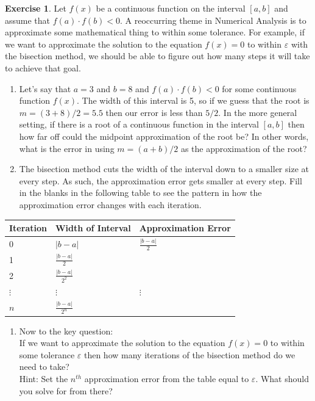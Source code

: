 \documentclass[
]{book}
\providecommand{\tightlist}{%
  \setlength{\itemsep}{0pt}\setlength{\parskip}{0pt}}
\theoremstyle{definition}
\theoremstyle{definition}
\theoremstyle{definition}
\newtheorem{exercise}{Exercise}[chapter]
\theoremstyle{remark}
\begin{document}
\begin{exercise}
\protect\hypertarget{exr:bisectionerror}{}{\label{exr:bisectionerror} }Let \(f(x)\) be a continuous function on the interval \([a,b]\) and assume
that \(f(a) \cdot f(b) <0\). A reoccurring theme in Numerical Analysis is to
approximate some mathematical thing to within some tolerance. For
example, if we want to approximate the solution to the equation \(f(x)=0\)
to within \(\varepsilon\) with the bisection method, we should be able to
figure out how many steps it will take to achieve that goal.

\begin{enumerate}
\def\labelenumi{\alph{enumi}.}
\item
  Let's say that \(a = 3\) and \(b = 8\) and \(f(a) \cdot f(b) < 0\) for
  some continuous function \(f(x)\). The width of this interval is 5, so
  if we guess that the root is \(m=(3+8)/2 = 5.5\) then our error is
  less than \(5/2\). In the more general setting, if there is a root of
  a continuous function in the interval \([a,b]\) then how far off could
  the midpoint approximation of the root be? In other words, what is
  the error in using \(m=(a+b)/2\) as the approximation of the root?
\item
  The bisection method cuts the width of the interval down to a
  smaller size at every step. As such, the approximation error gets
  smaller at every step. Fill in the blanks in the following table to
  see the pattern in how the approximation error changes with each
  iteration.
\end{enumerate}

\begin{longtable}[]{@{}lll@{}}
\toprule
Iteration & Width of Interval & Approximation Error\tabularnewline
\midrule
\endhead
0 & \(|b-a|\) & \(\frac{|b-a|}{2}\)\tabularnewline
1 & \(\frac{|b-a|}{2}\) &\tabularnewline
2 & \(\frac{|b-a|}{2^2}\) &\tabularnewline
\(\vdots\) & \(\vdots\) & \(\vdots\)\tabularnewline
\(n\) & \(\frac{|b-a|}{2^n}\) &\tabularnewline
\bottomrule
\end{longtable}

\begin{enumerate}
\def\labelenumi{\alph{enumi}.}
\setcounter{enumi}{2}
\tightlist
\item
  Now to the key question:\\
  If we want to approximate the solution to the equation \(f(x)=0\) to
  within some tolerance \(\varepsilon\) then how many iterations of the
  bisection method do we need to take?\\
  Hint: Set the \(n^{th}\) approximation error from the table equal to
  \(\varepsilon\). What should you solve for from there?
\end{enumerate}
\end{exercise}
\end{document}

